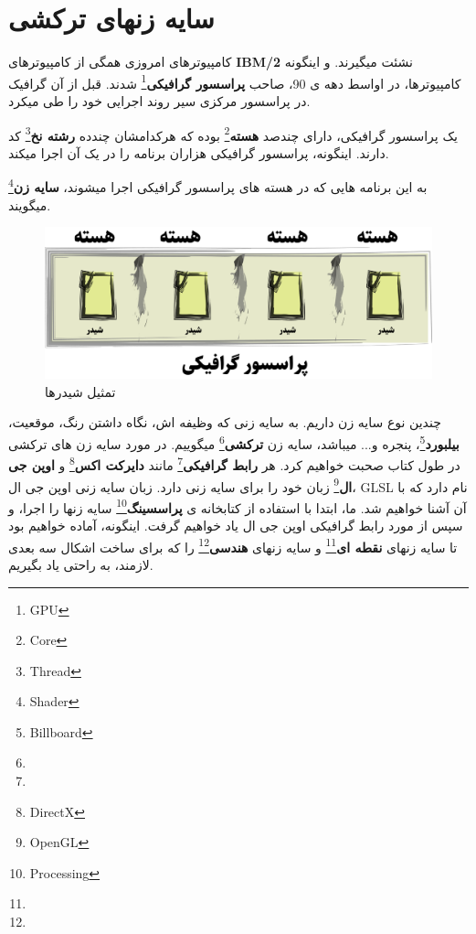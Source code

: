 \documentclass[14pt,a4paper]{memoir}
\begin{document}
	 
	 
	 
	 
\section{سایه زنهای ترکشی}\label{frag}

	 
	 
	 کامپیوترهای امروزی همگی از کامپیوترهای \textbf{IBM/2} نشئت میگیرند. و اینگونه کامپیوترها، در اواسط دهه ی 90، صاحب \textbf{پراسسور گرافیکی}\footnote{GPU} شدند. قبل از آن گرافیک در پراسسور مرکزی سیر روند اجرایی خود را طی میکرد. 
	 
	 
	 یک پراسسور گرافیکی، دارای چندصد \textbf{هسته}\footnote{Core} بوده که هرکدامشان چندده \textbf{رشته نخ}\footnote{Thread} کد دارند. اینگونه، پراسسور گرافیکی هزاران برنامه را در یک آن اجرا میکند.
	 
	 به این برنامه هایی که در هسته های پراسسور گرافیکی اجرا میشوند، \textbf{سایه زن}\footnote{Shader} میگویند. 
	 
	 
	 
	 \begin{figure}[H]
	 	\centering
	 	\includegraphics[scale=1]{Shaders}
	 	\caption{تمثیل شیدرها}
	 \end{figure}
	 
	 
	 چندین نوع سایه زن داریم. به سایه زنی که وظیفه اش، نگاه داشتن رنگ، موقعیت، \textbf{بیلبورد}\footnote{Billboard}، پنجره و... میباشد، سایه زن \textbf{ترکشی}\footnote{} میگوییم. در مورد سایه زن های ترکشی در طول کتاب صحبت خواهیم کرد. هر \textbf{رابط گرافیکی}\footnote{} مانند \textbf{دایرکت اکس}\footnote{DirectX} و \textbf{اوپن جی ال}\footnote{OpenGL} زبان خود را برای سایه زنی دارد. زبان سایه زنی اوپن جی ال، GLSL نام دارد که با آن آشنا خواهیم شد. ما، ابتدا با استفاده از کتابخانه ی \textbf{پراسسینگ}\footnote{Processing} سایه زنها را اجرا، و سپس از مورد رابط گرافیکی اوپن جی ال یاد خواهیم گرفت. اینگونه، آماده خواهیم بود تا سایه زنهای \textbf{نقطه ای}\footnote{} و سایه زنهای \textbf{هندسی}\footnote{} را که برای ساخت اشکال سه بعدی لازمند، به راحتی یاد بگیریم.
	 
\end{document}
